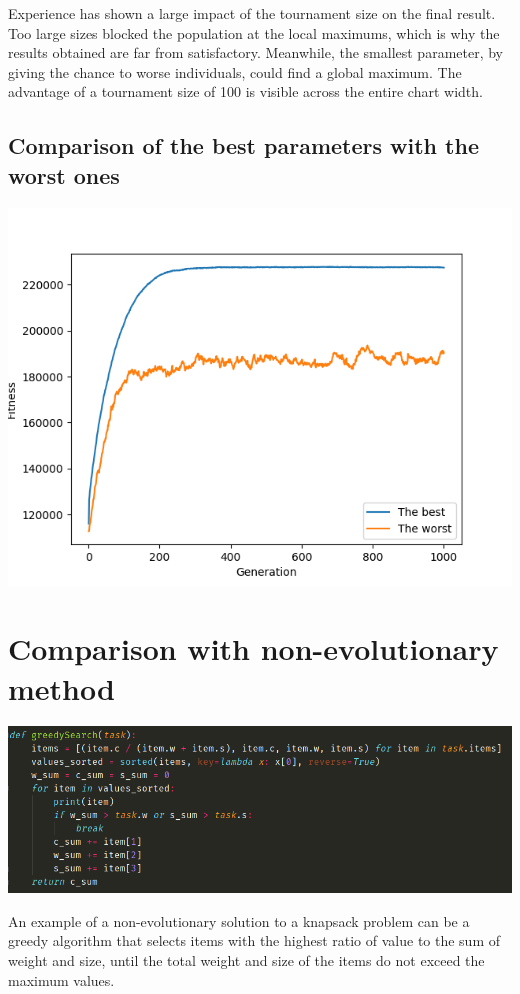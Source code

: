 \documentclass[12pt]{article}
\begin{document}
Experience has shown a large impact of the tournament size on the final result. Too large sizes blocked the population at the local maximums, which is why the results obtained are far from satisfactory. Meanwhile, the smallest parameter, by giving the chance to worse individuals, could find a global maximum. The advantage of a tournament size of 100 is visible across the entire chart width.

\subsection{Comparison of the best parameters with the worst ones}
\hspace*{-1.5cm}
\includegraphics[scale=0.95]{best_vs_worst}

\section{Comparison with non-evolutionary method}
\begin{center}
	\includegraphics[scale=0.5]{greedy}
\end{center}

An example of a non-evolutionary solution to a knapsack problem can be a greedy algorithm that selects items with the highest ratio of value to the sum of weight and size, until the total weight and size of the items do not exceed the maximum values.
\end{document}
